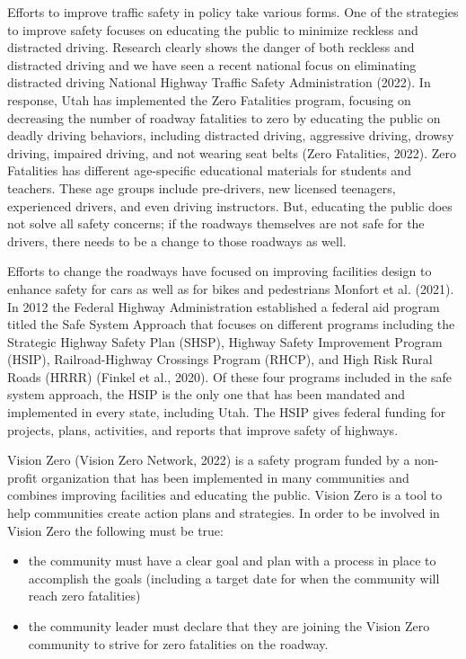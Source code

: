 \documentclass[
  letterpaper,
  DIV=11,
  numbers=noendperiod]{scrreport}
\providecommand{\tightlist}{%
  \setlength{\itemsep}{0pt}\setlength{\parskip}{0pt}}\usepackage{longtable,booktabs,array}
\begin{document}
Efforts to improve traffic safety in policy take various forms. One of
the strategies to improve safety focuses on educating the public to
minimize reckless and distracted driving. Research clearly shows the
danger of both reckless and distracted driving and we have seen a recent
national focus on eliminating distracted driving National Highway
Traffic Safety Administration (2022). In response, Utah has implemented
the Zero Fatalities program, focusing on decreasing the number of
roadway fatalities to zero by educating the public on deadly driving
behaviors, including distracted driving, aggressive driving, drowsy
driving, impaired driving, and not wearing seat belts (Zero Fatalities,
2022). Zero Fatalities has different age-specific educational materials
for students and teachers. These age groups include pre-drivers, new
licensed teenagers, experienced drivers, and even driving instructors.
But, educating the public does not solve all safety concerns; if the
roadways themselves are not safe for the drivers, there needs to be a
change to those roadways as well.

Efforts to change the roadways have focused on improving facilities
design to enhance safety for cars as well as for bikes and pedestrians
Monfort et al. (2021). In 2012 the Federal Highway Administration
established a federal aid program titled the Safe System Approach that
focuses on different programs including the Strategic Highway Safety
Plan (SHSP), Highway Safety Improvement Program (HSIP), Railroad-Highway
Crossings Program (RHCP), and High Risk Rural Roads (HRRR) (Finkel et
al., 2020). Of these four programs included in the safe system approach,
the HSIP is the only one that has been mandated and implemented in every
state, including Utah. The HSIP gives federal funding for projects,
plans, activities, and reports that improve safety of highways.

Vision Zero (Vision Zero Network, 2022) is a safety program funded by a
non-profit organization that has been implemented in many communities
and combines improving facilities and educating the public. Vision Zero
is a tool to help communities create action plans and strategies. In
order to be involved in Vision Zero the following must be true:

\begin{itemize}
\tightlist
\item
  the community must have a clear goal and plan with a process in place
  to accomplish the goals (including a target date for when the
  community will reach zero fatalities)
\item
  the community leader must declare that they are joining the Vision
  Zero community to strive for zero fatalities on the roadway.
\end{itemize}
\end{document}
